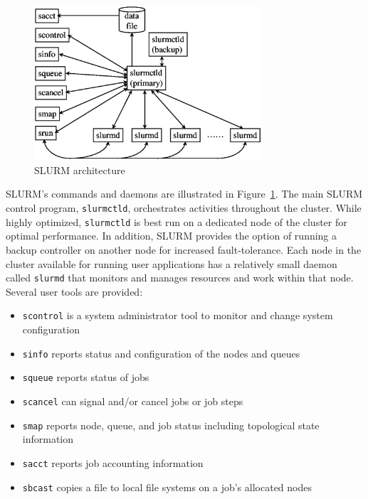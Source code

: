 \documentclass[10pt,twocolumn,times]{../common/llncs}
\begin{document}
{\begin{figure}[tb]
\centerline{\includegraphics[width=3.32in]{../figures/arch2.eps}}
\caption{\small SLURM architecture}
\label{arch}
\end{figure}

SLURM's commands and daemons are illustrated in Figure~\ref{arch}.
The main SLURM control program, {\tt slurmctld}, orchestrates
activities throughout the cluster. While highly optimized, 
{\tt slurmctld} is best run on a dedicated node of the cluster for optimal performance. 
In addition, SLURM provides the option of running  a backup controller 
on another node for increased fault-tolerance.
Each node in the cluster available for running user applications 
has a relatively small daemon called {\tt slurmd} that monitors
and manages resources and work within that node. 
Several user tools are provided:

\begin{itemize}
\item {\tt scontrol} is a system administrator tool to monitor and change
system configuration

\item {\tt sinfo} reports status and configuration of the nodes and queues

\item {\tt squeue} reports status of jobs

\item {\tt scancel} can signal and/or cancel jobs or job steps

\item {\tt smap} reports node, queue, and job status including 
topological state information

\item {\tt sacct} reports job accounting information

\item {\tt sbcast} copies a file to local file systems on a job's allocated nodes


\end{itemize}}
\end{document}
